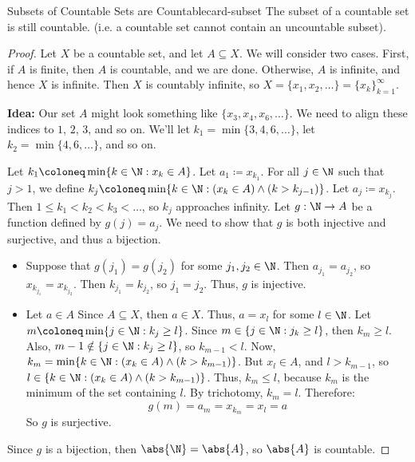 \begin{thmbox}{Subsets of Countable Sets are Countable}{card-subset}
    The subset of a countable set is still countable. (i.e. a countable set cannot contain an uncountable subset).
    \tcblower
    \begin{proof}
        Let $X$ be a countable set, and let $A \subseteq X$. We will consider two cases. First, if $A$ is finite, then $A$ is countable, and we are done. Otherwise, $A$ is infinite, and hence $X$ is infinite. Then $X$ is countably infinite, so $X = \{x_1, x_2, \ldots\} = \{x_k\}_{k=1}^\infty$.
        \begin{notebox}
            \textbf{Idea:} Our set $A$ might look something like $\{x_3, x_4, x_6, \ldots\}$. We need to align these indices to $1$, $2$, $3$, and so on. We'll let $k_1 = \min\{3,4,6,\ldots\}$, let $k_2 = \min\{4,6,\ldots\}$, and so on.
        \end{notebox}
        Let $k_1 \coloneq \min\{k \in \N : x_k \in A\}$. Let $a_1 \coloneq x_{k_1}$. For all $j \in \N$ such that $j > 1$, we define $k_j \coloneq \min\{k \in \N : (x_k \in A) \land (k > k_{j-1}) \}$. Let $a_j \coloneq x_{k_j}$. Then $1 \leq k_1 < k_2 < k_3 < \ldots$, so $k_j$ approaches infinity. Let $g : \N \to A$ be a function defined by $g(j) = a_j$. We need to show that $g$ is both injective and surjective, and thus a bijection.
        \begin{itemize}
            \item Suppose that $g(j_1) = g(j_2)$ for some $j_1, j_2 \in \N$. Then $a_{j_1} = a_{j_2}$, so $x_{k_{j_1}} = x_{k_{j_2}}$. Then $k_{j_1} = k_{j_2}$, so $j_1 = j_2$. Thus, $g$ is injective.
            \item Let $a \in A$ Since $A \subseteq X$, then $a \in X$. Thus, $a = x_l$ for some $l \in \N$. Let $m \coloneq \min\{ j \in \N : k_j \geq l \}$. Since $m \in \{ j \in \N : j_k \geq l \}$, then $k_m \geq l$. Also, $m-1 \notin \{j \in \N : k_j \geq l \}$, so $k_{m-1} < l$. Now, $k_m = \min\{k \in \N : (x_k \in A) \land (k > k_{m-1})\}$. But $x_l \in A$, and $l > k_{m-1}$, so $l \in \{k \in \N : (x_k \in A) \land (k > k_{m-1}) \}$. Thus, $k_m \leq l$, because $k_m$ is the minimum of the set containing $l$. By trichotomy, $k_m = l$. Therefore:
            \[ g(m) = a_m = x_{k_m} = x_l = a \]
            So $g$ is surjective.
        \end{itemize}
        Since $g$ is a bijection, then $\abs{\N} = \abs{A}$, so $\abs{A}$ is countable.
    \end{proof}
\end{thmbox}

